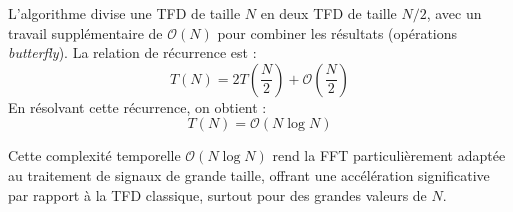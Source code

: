 

\begin{algorithm}[H]
\label{alg:fft-algo}
\caption{\textbf{Algorithme FFT}}


\end{algorithm}

\vspace{0.5cm}
L'algorithme divise une TFD de taille \( N \) en deux TFD de taille \( N/2 \), avec un travail supplémentaire de \( \mathcal{O}(N) \) pour combiner les résultats (opérations \textit{butterfly}). La relation de récurrence est :
    \[
    T(N) = 2T\left(\frac{N}{2}\right) + \mathcal{O}\left(\frac{N}{2}\right)
    \]
    En résolvant cette récurrence, on obtient :
    \[
    T(N) = \mathcal{O}(N \log N)
    \]

Cette complexité temporelle \( \mathcal{O}(N \log N) \) rend la FFT particulièrement adaptée au traitement de signaux de grande taille, offrant une accélération significative par rapport à la TFD classique, surtout pour des grandes valeurs de \( N \).

